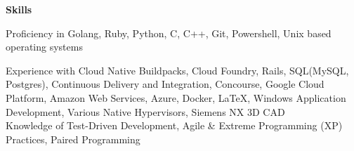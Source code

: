 \documentclass[10pt,a4papaer]{article}
\begin{document}
{		\setlength{\leftskip}{0pt}
		
		{\noindent\textbf{Skills}}\vspace*{-20px}\\
		
		\noindent\makebox[\linewidth]{\rule{\textwidth}{1.3pt}}
		
		Proficiency in Golang, Ruby, Python, C, C++, Git, Powershell, Unix based operating systems\\
		
		\setlength{\leftskip}{15pt}
		
		{\noindent Experience with Cloud Native Buildpacks, Cloud Foundry, Rails, SQL(MySQL, Postgres), Continuous Delivery and Integration, Concourse, Google Cloud Platform, Amazon Web Services, Azure, Docker, \LaTeX, Windows Application Development, Various Native Hypervisors, Siemens NX 3D CAD}\\
		
		{\noindent Knowledge of Test-Driven Development, Agile \& Extreme Programming (XP) Practices, Paired Programming\\}
		
		\setlength{\leftskip}{0pt}
		
		
		
	}
\end{document}
